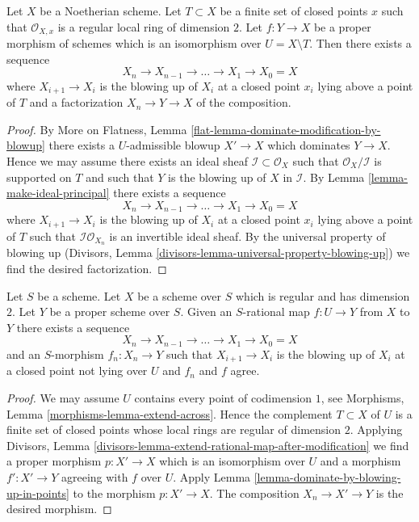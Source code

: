 \begin{lemma}
\label{lemma-dominate-by-blowing-up-in-points}
Let $X$ be a Noetherian scheme. Let $T \subset X$ be a finite set of
closed points $x$ such that $\mathcal{O}_{X, x}$ is a regular local
ring of dimension $2$. Let $f : Y \to X$ be a proper morphism of
schemes which is an isomorphism over $U = X \setminus T$.
Then there exists a sequence
$$
X_n \to X_{n - 1} \to \ldots \to X_1 \to X_0 = X
$$
where $X_{i + 1} \to X_i$ is the blowing up of $X_i$ at a closed
point $x_i$ lying above a point of $T$ and a factorization $X_n \to Y \to X$
of the composition.
\end{lemma}

\begin{proof}
By More on Flatness, Lemma \ref{flat-lemma-dominate-modification-by-blowup} 
there exists a $U$-admissible blowup $X' \to X$ which dominates
$Y \to X$. Hence we may assume there exists an ideal sheaf
$\mathcal{I} \subset \mathcal{O}_X$ such that
$\mathcal{O}_X/\mathcal{I}$ is supported on $T$ and such that
$Y$ is the blowing up of $X$ in $\mathcal{I}$.
By Lemma \ref{lemma-make-ideal-principal} 
there exists a sequence
$$
X_n \to X_{n - 1} \to \ldots \to X_1 \to X_0 = X
$$
where $X_{i + 1} \to X_i$ is the blowing up of $X_i$ at a closed
point $x_i$ lying above a point of $T$ such that
$\mathcal{I}\mathcal{O}_{X_n}$ is an invertible ideal sheaf.
By the universal property of blowing up
(Divisors, Lemma
\ref{divisors-lemma-universal-property-blowing-up})
we find the desired factorization.
\end{proof}

\begin{lemma}
\label{lemma-extend-rational-map-blowing-up}
Let $S$ be a scheme. Let $X$ be a scheme over $S$ which is
regular and has dimension $2$. Let $Y$ be a proper
scheme over $S$. Given an $S$-rational map $f : U \to Y$ from
$X$ to $Y$ there exists a sequence
$$
X_n \to X_{n - 1} \to \ldots \to X_1 \to X_0 = X
$$
and an $S$-morphism $f_n : X_n \to Y$ such that $X_{i + 1} \to X_i$
is the blowing up of $X_i$ at a closed point not lying over $U$
and $f_n$ and $f$ agree.
\end{lemma}

\begin{proof}
We may assume $U$ contains every point of codimension $1$, see
Morphisms, Lemma \ref{morphisms-lemma-extend-across}.
Hence the complement $T \subset X$ of $U$ is a finite set
of closed points whose local rings are regular of dimension $2$.
Applying
Divisors, Lemma \ref{divisors-lemma-extend-rational-map-after-modification}
we find a proper morphism $p : X' \to X$ which is an isomorphism
over $U$ and a morphism $f' : X' \to Y$ agreeing with $f$ over $U$.
Apply Lemma \ref{lemma-dominate-by-blowing-up-in-points}
to the morphism $p : X' \to X$. The composition $X_n \to X' \to Y$ is
the desired morphism.
\end{proof}






